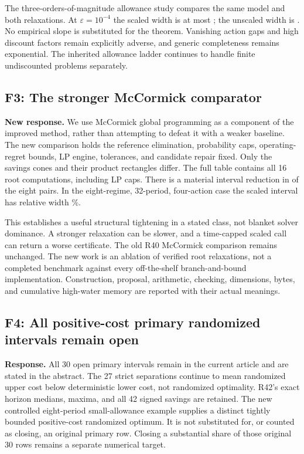 The three-orders-of-magnitude allowance study compares the same model and both relaxations. At $\varepsilon=10^{-4}$ the scaled width is at most \RScaleGap{}; the unscaled width is \RScaleUnscaled{}. No empirical slope is substituted for the theorem. Vanishing action gaps and high discount factors remain explicitly adverse, and generic completeness remains exponential. The inherited allowance ladder continues to handle finite undiscounted problems separately.

\subsection*{F3: The stronger McCormick comparator}
\textbf{New response.} We use McCormick global programming as a component of the improved method, rather than attempting to defeat it with a weaker baseline. The new comparison holds the reference elimination, probability caps, operating-regret bounds, LP engine, tolerances, and candidate repair fixed. Only the savings cones and their product rectangles differ. The full table contains all 16 root computations, including \RControlledCaps{} LP caps. There is a material interval reduction in \RControlledImproved{} of the eight pairs. In the eight-regime, 32-period, four-action case the scaled interval has relative width \RLongRelative\%.

This establishes a useful structural tightening in a stated class, not blanket solver dominance. A stronger relaxation can be slower, and a time-capped scaled call can return a worse certificate. The old R40 McCormick comparison remains unchanged. The new work is an ablation of verified root relaxations, not a completed benchmark against every off-the-shelf branch-and-bound implementation. Construction, proposal, arithmetic, checking, dimensions, bytes, and cumulative high-water memory are reported with their actual meanings.

\subsection*{F4: All positive-cost primary randomized intervals remain open}
\textbf{Response.} All 30 open primary intervals remain in the current article and are stated in the abstract. The 27 strict separations continue to mean randomized upper cost below deterministic lower cost, not randomized optimality. R42's exact horizon medians, maxima, and all 42 signed savings are retained. The new controlled eight-period small-allowance example supplies a distinct tightly bounded positive-cost randomized optimum. It is not substituted for, or counted as closing, an original primary row. Closing a substantial share of those original 30 rows remains a separate numerical target.

